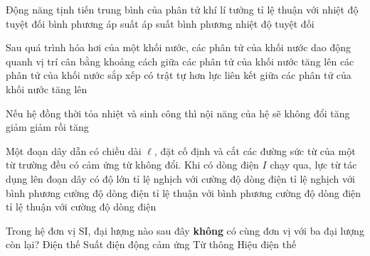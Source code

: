 	\begin{ex}%
		Động năng tịnh tiến trung bình của phân tử khí lí tưởng tỉ lệ thuận với
		\choice
		{\True nhiệt độ tuyệt đối}
		{bình phương áp suất}
		{áp suất}
		{bình phương nhiệt độ tuyệt đối}
	\end{ex}

	\begin{ex}%
		Sau quá trình hóa hơi của một khối nước,
		\choice
		{các phân tử của khối nước dao động quanh vị trí cân bằng}
		{\True khoảng cách giữa các phân tử của khối nước tăng lên}
		{các phân tử của khối nước sắp xếp có trật tự hơn}
		{lực liên kết giữa các phân tử của khối nước tăng lên}
	\end{ex}

	\begin{ex}%
		Nếu hệ đồng thời tỏa nhiệt và sinh công thì nội năng của hệ sẽ
		\choice
		{không đổi}
		{tăng}
		{\True giảm}
		{giảm rồi tăng}
	\end{ex}

	\begin{ex}%
		Một đoạn dây dẫn có chiều dài $\ell$, đặt cố định và cắt các đường sức từ của một từ trường đều có cảm ứng từ không đổi. Khi có dòng điện $I$ chạy qua, lực từ tác dụng lên đoạn dây có độ lớn
		\choice
		{tỉ lệ nghịch với cường độ dòng điện}
		{tỉ lệ nghịch với bình phương cường độ dòng điện}
		{tỉ lệ thuận với bình phương cường độ dòng điện}
		{\True tỉ lệ thuận với cường độ dòng điện}
	\end{ex}

	\begin{ex}%
		Trong hệ đơn vị SI, đại lượng nào sau đây \textbf{không} có cùng đơn vị với ba đại lượng còn lại?
		\choice
		{Điện thế}
		{Suất điện động cảm ứng}
		{\True Từ thông}
		{Hiệu điện thế}
	\end{ex}


